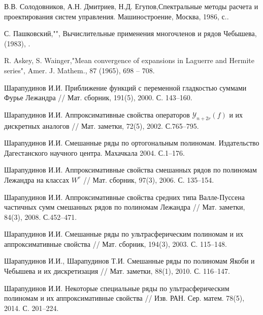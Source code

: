 \begin{thebibliography}{20}
В.В. Солодовников, А.Н. Дмитриев, Н.Д. Егупов,Спектральные методы расчета и проектирования систем управления. Машиностроение, Москва, 1986,  с..


С. Пашковский,"", Вычислительные применения многочленов и рядов Чебышева,  (1983), .


R. Askey, S. Wainger,"Mean convergence of expansions in Laguerre and Hermite series", Amer. J. Mathem., 87 (1965), 698 -- 708.


{Шарапудинов И.И.} Приближение функций с переменной гладкостью суммами Фурье Лежандра // Мат. сборник,
191(5), 2000. С. 143--160.



{Шарапудинов И.И.} Аппроксимативные свойства операторов $\mathcal{ Y}_{n+2r}(f)$ и их дискретных аналогов // Мат. заметки, 72(5), 2002. С.765--795.



{Шарапудинов И.И.} Смешанные ряды по ортогональным полиномам. Издательство Дагестанского научного центра.
Махачкала 2004. С.1--176.



{Шарапудинов И.И.}
Аппроксимативные свойства смешанных рядов по полиномам Лежандра на классах $W^r$ //
Мат. сборник, 97(3), 2006. С. 135--154.



{Шарапудинов И.И.}
Аппроксимативные свойства средних типа Валле-Пуссена частичных сумм смешанных рядов по полиномам Лежандра // Мат. заметки, 84(3), 2008. С.452--471.



{Шарапудинов И.И.}
Смешанные ряды по ультрасферическим полиномам и их аппроксимативные свойства
// Мат. сборник, 194(3), 2003. С. 115--148.



{Шарапудинов И.И., Шарапудинов Т.И.}
Смешанные ряды по полиномам Якоби и Чебышева и их дискретизация
// Мат. заметки, 88(1), 2010. С. 116--147.



{Шарапудинов И.И.}
Некоторые специальные ряды по ультрасферическим полиномам и их аппроксимативные свойства
// Изв. РАН. Сер. матем. 78(5), 2014. С. 201--224.




\end{thebibliography}
